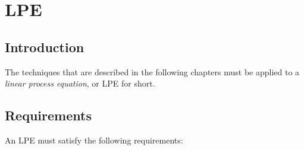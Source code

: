 \chapter{LPE}

\section{Introduction}
The techniques that are described in the following chapters must be applied to a \emph{linear process equation}, or LPE for short.

\section{Requirements}

An LPE must satisfy the following requirements:

